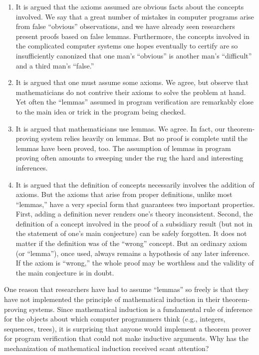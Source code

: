 \documentclass[10pt]{book}
\newenvironment{pubbullet}{\begin{enumerate}}{\end{enumerate}}
\begin{document}
\begin{pubbullet}
\item It is argued that the axioms assumed are obvious
facts about the concepts involved.  We say that a great number
of mistakes in computer programs arise from false ``obvious''
observations, and we have already seen  researchers
present proofs based on false lemmas.  Furthermore, the
concepts involved in the complicated computer systems
one hopes eventually to certify are so insufficiently
canonized that one man's ``obvious'' is another man's ``difficult''
and a third man's ``false.''
\item It is argued that one must assume some axioms.  We
agree, but observe that mathematicians do not contrive their
axioms to solve the problem at hand.  Yet often the ``lemmas''
assumed in program verification
are remarkably close to the main idea or trick in the
program being checked.
\item It is argued that
mathematicians use lemmas.  We agree. In fact,
our theorem-proving system relies heavily on lemmas.
But no proof is complete until 
the lemmas have  been proved, too.  The
assumption of lemmas in program proving often amounts to sweeping
under the rug the hard
and interesting inferences.
\item It is argued that the definition of concepts
necessarily involves the addition of axioms.
But the axioms that arise from proper definitions,
unlike most ``lemmas,'' have a very special form that
guarantees two important properties.
First, adding a definition never
renders one's theory inconsistent.  Second, the
definition of a  concept involved in the proof of a
subsidiary result (but not in the statement of
one's main conjecture) can be safely forgotten.
It does not matter if the definition was of the ``wrong''
concept.
But an ordinary axiom (or ``lemma''), once used, always remains
a hypothesis of any later inference.  If the
axiom is ``wrong,'' the whole proof may be worthless and
the validity of the main conjecture is in doubt.
\end{pubbullet}
One reason that researchers have had to
assume ``lemmas'' so freely is that they
have not implemented the principle of mathematical induction
in their theorem-proving systems.  Since mathematical
induction is a fundamental rule of inference for the
objects about which computer programmers think  (e.g., integers, sequences, trees), it
is surprising  that anyone would  implement a theorem prover for program verification
that could not make inductive arguments.  Why has
the mechanization of mathematical induction received scant attention?
\end{document}
